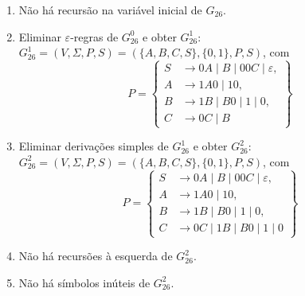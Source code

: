 \documentclass[12pt]{article}
\def\myling{{26}} %
\newcommand{\ve}{\ensuremath{\varepsilon}}
\begin{document}
\begin{tcolorbox}[breakable,rounded corners, colback=yellow!5, colframe=red!40!black, title={Transformações em $G_{\myling}$.}]
\begin{enumerate}
  \item Não há recursão na variável inicial de $G_{\myling}$.
  \item Eliminar $\ve$-regras de $G_{\myling}^0$ e obter $G_{\myling}^1$:\\
  $G_{\myling}^1=(V,\Sigma,P,S)=(\{A,B,C,S\},\{0,1\},P,S)$, com
    \[P=\left\{
     \begin{aligned}
      S & \to 0A \mid B \mid 00C \mid \ve, \\
      A & \to 1A0 \mid 10, \\
      B & \to 1B \mid B0 \mid 1 \mid 0, \\
      C & \to 0C \mid B  
     \end{aligned}
    \right\}\]
  \item Eliminar derivações simples de $G_{\myling}^1$ e obter $G_{\myling}^2$:\\
  $G_{\myling}^2=(V,\Sigma,P,S)=(\{A,B,C,S\},\{0,1\},P,S)$, com
    \[P=\left\{
     \begin{aligned}
      S & \to 0A \mid B \mid 00C \mid \ve, \\
      A & \to 1A0 \mid 10, \\
      B & \to 1B \mid B0 \mid 1 \mid 0, \\
      C & \to 0C \mid 1B \mid B0 \mid 1 \mid 0 
     \end{aligned}
    \right\}\]
\item Não há recursões à esquerda de $G_{\myling}^2$.\\
 \item Não há símbolos inúteis de $G_{\myling}^2$.\\

\end{enumerate}
\end{tcolorbox}
\end{document}
